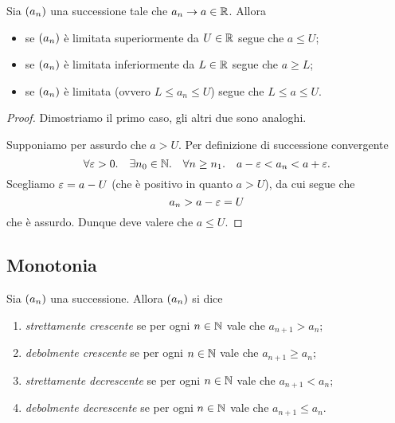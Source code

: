 \begin{proposition}
    \label{prop:comp_limite_succ_limit}
    Sia $\seqn*{a}$ una successione tale che $a_n \to a \in \mathbb{R}$. Allora \begin{itemize}
        \item se $\seqn*{a}$ è limitata superiormente da $U \in \mathbb{R}$ segue che $a \leq U$;
        \item se $\seqn*{a}$ è limitata inferiormente da $L \in \mathbb{R}$ segue che $a \geq L$;
        \item se $\seqn*{a}$ è limitata (ovvero $L \leq a_n \leq U$) segue che $L \leq a \leq U$.
    \end{itemize}
\end{proposition}
\begin{proof}
    Dimostriamo il primo caso, gli altri due sono analoghi.

    Supponiamo per assurdo che $a > U$. Per definizione di successione convergente \[
        \forall \varepsilon > 0. \quad \exists n_0 \in \mathbb{N}. \quad \forall n \geq n_1. \quad a - \varepsilon < a_n < a + \varepsilon.   
    \] Scegliamo $\varepsilon = a - U$ (che è positivo in quanto $a > U$), da cui segue che \[
        a_n > a - \varepsilon = U    
    \] che è assurdo. Dunque deve valere che $a \leq U$.
\end{proof}

\subsection{Monotonia}

\begin{definition}
     \label{def:succ_monotona}
    Sia $\seqn*{a}$ una successione. Allora $\seqn*{a}$ si dice \begin{enumerate}
        \item \emph{strettamente crescente} se per ogni $n \in \mathbb{N}$ vale che $a_{n+1} > a_n$;
        \item \emph{debolmente crescente} se per ogni $n \in \mathbb{N}$ vale che $a_{n+1} \geq a_n$;
        \item \emph{strettamente decrescente} se per ogni $n \in \mathbb{N}$ vale che $a_{n+1} < a_n$;
        \item \emph{debolmente decrescente} se per ogni $n \in \mathbb{N}$ vale che $a_{n+1} \leq a_n$.
    \end{enumerate}
\end{definition}

